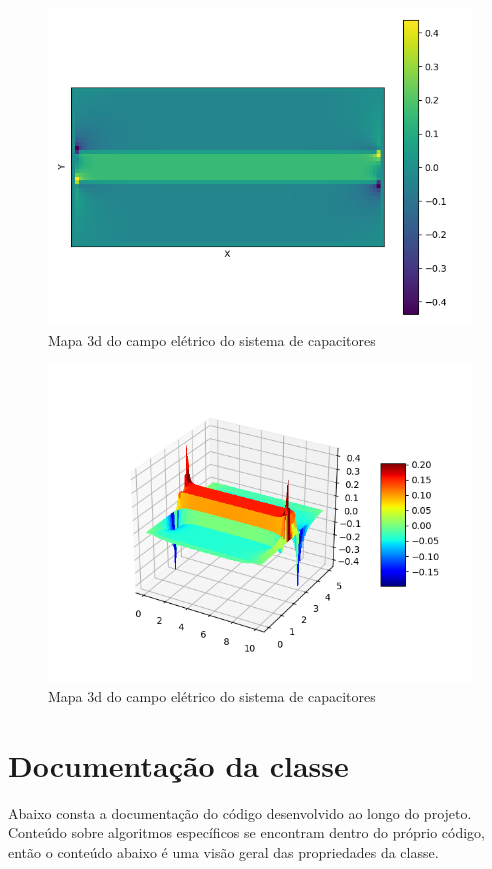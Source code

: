 \documentclass[oneside]{abntex2}
\begin{document}
\begin{figure}[h!]
    \centering
    \includegraphics[scale=0.8]{imgs/hmap_aprox_cap_elet_1250.png}
    \caption{Mapa 3d do campo elétrico do sistema de capacitores}
    \label{fig:my_label}
\end{figure}

\begin{figure}[h!]
    \centering
    \includegraphics[scale=0.8]{imgs/3d_aprox_cap_elet_1250.png}
    \caption{Mapa 3d do campo elétrico do sistema de capacitores}
    \label{fig:my_label}
\end{figure}

\newpage
\newpage


\section{Documentação da classe} \label{sec_doc}
Abaixo consta a documentação do código desenvolvido ao longo do projeto. Conteúdo sobre algoritmos específicos se encontram dentro do próprio código, então o conteúdo abaixo é uma visão geral das propriedades da classe.
\end{document}
